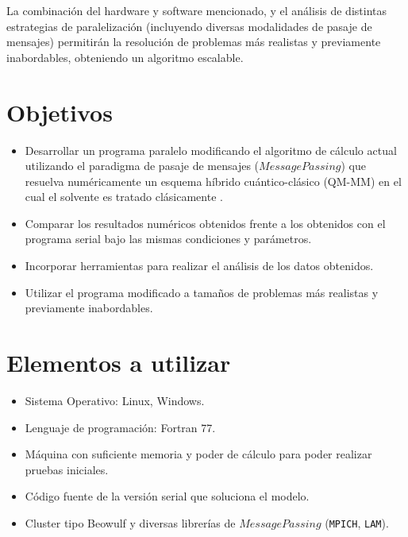 \documentclass[a4paper, 12pt]{article}
\begin{document}
La combinaci\'on del hardware y software mencionado, y el an\'alisis de distintas estrategias de paralelizaci\'on (incluyendo diversas modalidades de pasaje de mensajes) permitir\'an la resoluci\'on de problemas m\'as realistas y previamente inabordables, obteniendo un algoritmo escalable.


\section*{Objetivos}

\begin{itemize}
\item Desarrollar un programa paralelo modificando el algoritmo de c\'alculo actual utilizando el paradigma de pasaje de mensajes ($Message Passing$) que resuelva num\'ericamente un esquema h\'ibrido cu\'antico-cl\'asico (QM-MM) en el cual el solvente es tratado cl\'asicamente \cite{Nemukhin2002, Kesavan2003, lebrero2002}.

\item Comparar los resultados num\'ericos obtenidos frente a los obtenidos con el programa serial bajo las mismas condiciones y par\'ametros.

\item Incorporar herramientas para realizar el an\'alisis de los datos obtenidos.

\item Utilizar el programa modificado a tama\~nos de problemas m\'as realistas y previamente inabordables.

\end{itemize}

\section*{Elementos a utilizar}

\begin{itemize}
\item Sistema Operativo: Linux, Windows.

\item Lenguaje de programaci\'on: Fortran 77.

\item M\'aquina con suficiente memoria y poder de c\'alculo para poder realizar pruebas iniciales.

\item C\'odigo fuente de la versi\'on serial que soluciona el modelo.

\item Cluster tipo Beowulf y diversas librer\'ias de $Message Passing$ (\texttt{MPICH}\cite{MPICH}, \texttt{LAM}\cite{LAM_MPI}).

\end{itemize}
\end{document}
